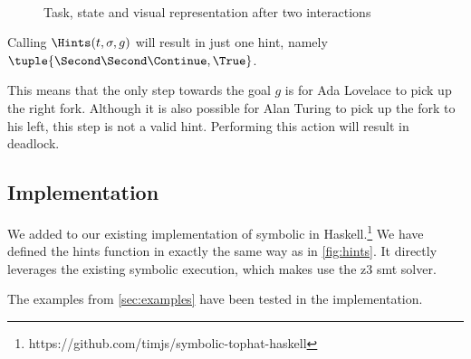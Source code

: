 \begin{figure}
\begin{minipage}[r]{0.3\textwidth}

\end{minipage}\\
\caption{Task, state and visual representation after two interactions}
\end{figure}





Calling $\Hints(t,\sigma,g)$ will result in just one hint, namely $\tuple{\Second\Second\Continue,\True}$.

This means that the only step towards the goal $g$ is for Ada Lovelace to pick up the right fork.
Although it is also possible for Alan Turing to pick up the fork to his left, this step is not a valid hint.
Performing this action will result in deadlock.


\subsection{Implementation}
\label{sec:implementation}

We added \ASTOPHAT to our existing implementation of symbolic \TOPHAT in Haskell.\footnote{https://github.com/timjs/symbolic-tophat-haskell}
We have defined the hints function in exactly the same way as in \cref{fig:hints}.
It directly leverages the existing symbolic execution, which makes use the z3 smt solver.

The examples from \cref{sec:examples} have been tested in the implementation.
